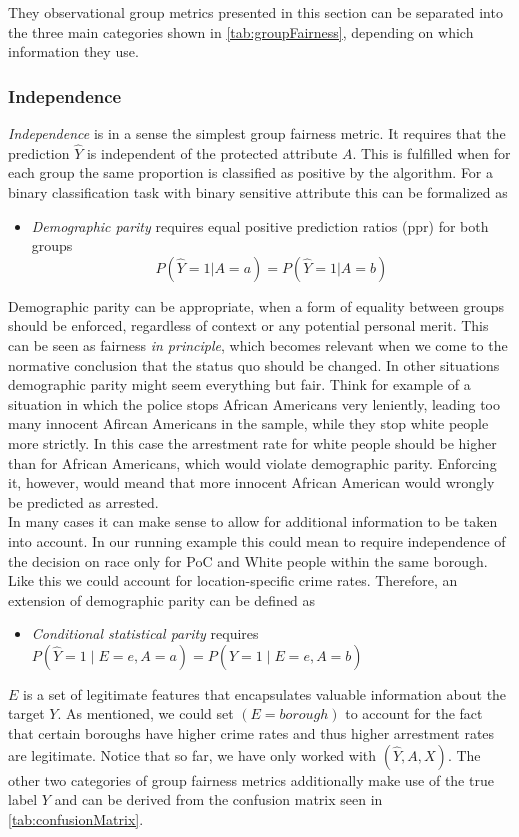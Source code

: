 They observational group metrics presented in this section can be separated into the three main categories shown in \autoref{tab:groupFairness}, depending on which information they use.

\subsubsection*{Independence}
\textit{Independence} is in a sense the simplest group fairness metric. It requires that the prediction $\hat{Y}$ is independent of the protected attribute $A$. This is fulfilled when for each group the same proportion is classified as positive by the algorithm. For a binary classification task with binary sensitive attribute this can be formalized as
\begin{itemize}
    \item \textit{Demographic parity} requires equal positive prediction ratios (ppr) for both groups $$P(\hat{Y} = 1 | A = a) = P(\hat{Y} = 1 | A = b)$$
\end{itemize}
Demographic parity can be appropriate, when a form of equality between groups should be enforced, regardless of context or any potential personal merit.
This can be seen as fairness \textit{in principle}, which becomes relevant when we come to the normative conclusion that the status quo should be changed. In other situations demographic parity might seem everything but fair. Think for example of a situation in which the police stops African Americans very leniently, leading too many innocent Afircan Americans in the sample, while they stop white people more strictly. In this case the arrestment rate for white people should be higher than for African Americans, which would violate demographic parity. Enforcing it, however, would meand that more innocent African American would wrongly be predicted as arrested.\\
In many cases it can make sense to allow for additional information to be taken into account. In our running example this could mean to require independence of the decision on race only for PoC and White people within the same borough. Like this we could account for location-specific crime rates. Therefore, an extension of demographic parity can be defined as
\begin{itemize}
    \item \textit{Conditional statistical parity} requires $P(\hat{Y} = 1 \mid E = e, A = a) = P(\hat{Y} = 1 \mid E = e, A = b)$
\end{itemize}
$E$ is a set of legitimate features that encapsulates valuable information about the target $Y$. As mentioned, we could set $(E = borough)$ to account for the fact that certain boroughs have higher crime rates and thus higher arrestment rates are legitimate.
Notice that so far, we have only worked with $(\hat{Y},A,X)$. The other two categories of group fairness metrics additionally make use of the true label $Y$ and can be derived from the confusion matrix seen in \autoref{tab:confusionMatrix}.



